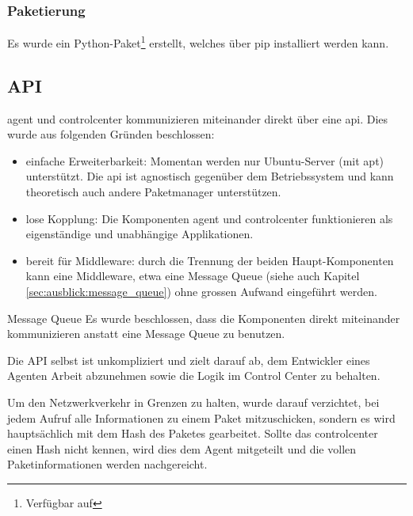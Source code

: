 \subsubsection*{Paketierung}

Es wurde ein Python-Paket\footnote{Verfügbar auf } erstellt, welches über \gls{pip} installiert werden kann.

\clearpage
\subsection*{API} \label{sec:architecture:api}

\gls{agent} und \gls{controlcenter} kommunizieren miteinander direkt über eine \gls{api}. Dies wurde aus folgenden Gründen beschlossen:

\begin{itemize}
    \item einfache Erweiterbarkeit: Momentan werden nur Ubuntu-Server (mit \gls{apt}) unterstützt. Die \gls{api} ist agnostisch gegenüber dem Betriebssystem und kann theoretisch auch andere Paketmanager unterstützen.
    \item lose Kopplung: Die Komponenten \gls{agent} und \gls{controlcenter} funktionieren als eigenständige und unabhängige Applikationen.
    \item bereit für Middleware: durch die Trennung der beiden Haupt-Komponenten kann eine Middleware, etwa eine Message Queue (siehe auch Kapitel \ref{sec:ausblick:message_queue}) ohne grossen Aufwand eingeführt werden.
\end{itemize}


\begin{decision}{Message Queue}
Es wurde beschlossen, dass die Komponenten direkt miteinander kommunizieren anstatt eine Message Queue zu benutzen.
\end{decision}


Die API selbst ist unkompliziert und zielt darauf ab, dem Entwickler eines Agenten Arbeit abzunehmen sowie die Logik im Control Center zu behalten.

Um den Netzwerkverkehr in Grenzen zu halten, wurde darauf verzichtet, bei jedem Aufruf alle Informationen zu einem Paket mitzuschicken, sondern es wird hauptsächlich mit dem Hash des Paketes gearbeitet. Sollte das \gls{controlcenter} einen Hash nicht kennen, wird dies dem Agent mitgeteilt und die vollen Paketinformationen werden nachgereicht.

